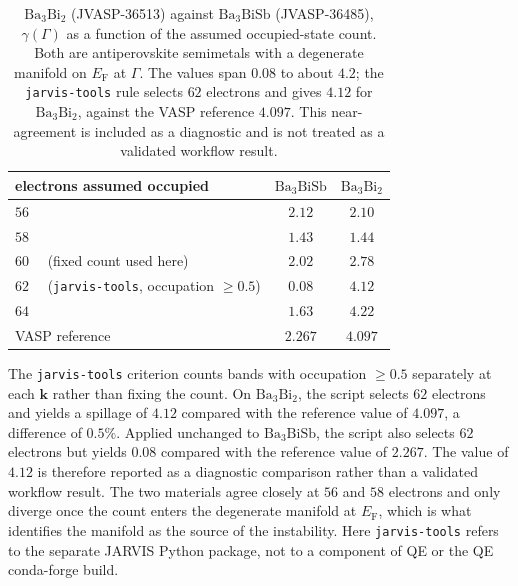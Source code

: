 \documentclass[11pt]{article}
\newcommand{\kk}{\mathbf{k}}
\newcommand{\bath}{\mathrm{Ba_3BiSb}}
\begin{document}
\begin{table}[htbp]
\centering
\caption{$\mathrm{Ba_3Bi_2}$ (JVASP-36513) against $\bath$ (JVASP-36485), $\gamma(\Gamma)$ as a
function of the assumed occupied-state count. Both are antiperovskite semimetals with a degenerate manifold
on $E_{\mathrm F}$ at $\Gamma$. The values span $0.08$ to about $4.2$; the \texttt{jarvis-tools}
rule selects $62$ electrons and gives $4.12$ for $\mathrm{Ba_3Bi_2}$, against the VASP reference
$4.097$. This near-agreement is included as a diagnostic and is not treated as a validated workflow
result.}\label{tab:sweepba3bi2}
\setlength{\tabcolsep}{6pt}
\begin{tabular}{@{}lcc@{}}
\toprule
electrons assumed occupied & $\bath$ & $\mathrm{Ba_3Bi_2}$ \\
\midrule
$56$                                   & $2.12$ & $2.10$ \\
$58$                                   & $1.43$ & $1.44$ \\
$60$ \ \ (fixed count used here)       & $\mathbf{2.02}$ & $\mathbf{2.78}$ \\
$62$ \ \ (\texttt{jarvis-tools}, occupation $\ge 0.5$) & $0.08$ & $4.12$ \\
$64$                                   & $1.63$ & $4.22$ \\
\midrule
VASP reference                         & $2.267$ & $4.097$ \\
\bottomrule
\end{tabular}
\end{table}

The \texttt{jarvis-tools} criterion counts bands with
occupation $\geq 0.5$ separately at each $\kk$ rather than fixing the count. On
$\mathrm{Ba_3Bi_2}$, the script selects $62$ electrons and yields a spillage of $4.12$ compared with the reference value of
$4.097$, a difference of $0.5\%$. Applied unchanged to $\bath$, the script also selects $62$ electrons but
yields $0.08$ compared with the reference value of $2.267$. The value of $4.12$ is therefore reported
as a diagnostic comparison rather than a validated workflow result. The two materials agree closely at
$56$ and $58$ electrons and only diverge once the count enters the degenerate manifold at
$E_{\mathrm F}$, which is what identifies the manifold as the source of the instability.
Here \texttt{jarvis-tools} refers to the separate JARVIS Python package, not to a component of QE or
the QE conda-forge build.
\end{document}

